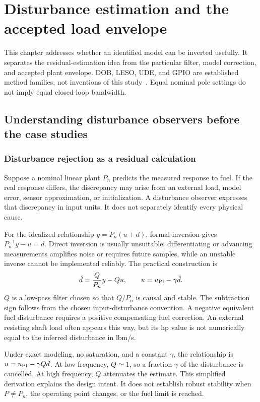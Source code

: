 \chapter{Disturbance estimation and the accepted load envelope}
\label{ch:observers}
This chapter addresses whether an identified model can be inverted usefully. It separates the residual-estimation idea from the particular filter, model correction, and accepted plant envelope. DOB, LESO, UDE, and GPIO are established method families, not inventions of this study~\cite{doboverview,gao,ude}. Equal nominal pole settings do not imply equal closed-loop bandwidth.

\section{Understanding disturbance observers before the case studies}
\subsection{Disturbance rejection as a residual calculation}
Suppose a nominal linear plant $P_n$ predicts the measured response to fuel. If the real response differs, the discrepancy may arise from an external load, model error, sensor approximation, or initialization. A disturbance observer expresses that discrepancy in input units. It does not separately identify every physical cause.

For the idealized relationship $y=P_n(u+d)$, formal inversion gives $P_n^{-1}y-u=d$. Direct inversion is usually unsuitable: differentiating or advancing measurements amplifies noise or requires future samples, while an unstable inverse cannot be implemented reliably. The practical construction is
\begin{equation}\hat d=\frac{Q}{P_n}y-Qu,\qquad u=u_{\rm PI}-\gamma\hat d.
\end{equation}
$Q$ is a low-pass filter chosen so that $Q/P_n$ is causal and stable. The subtraction sign follows from the chosen input-disturbance convention. A negative equivalent fuel disturbance requires a positive compensating fuel correction. An external resisting shaft load often appears this way, but its hp value is not numerically equal to the inferred disturbance in lbm/s.

Under exact modeling, no saturation, and a constant $\gamma$, the relationship is $u=u_{\rm PI}-\gamma Qd$. At low frequency, $Q\simeq1$, so a fraction $\gamma$ of the disturbance is cancelled. At high frequency, $Q$ attenuates the estimate. This simplified derivation explains the design intent. It does not establish robust stability when $P\ne P_n$, the operating point changes, or the fuel limit is reached.

